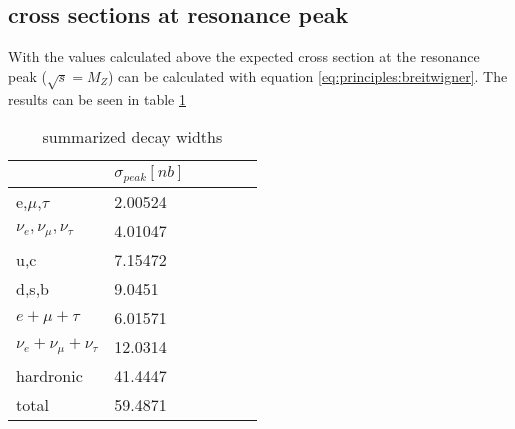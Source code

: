 \subsection{cross sections at resonance peak}
With the values calculated above the expected cross section at the resonance peak ($\sqrt{s}=M_Z$) can be calculated with equation \ref{eq:principles:breitwigner}.
The results can be seen in table \ref{tb:appendix:cross sections}
\begin{table}[H]\centering
	\begin{tabular}{@{}llllll@{}}
		\toprule
		& $\sigma_{peak}[nb]$\\
		\midrule
		e,$\mu $,$\tau $ & 2.00524 \\
		$\nu _e,\nu _{\mu },\nu _{\tau }$ & 4.01047 \\
		u,c & 7.15472 \\
		d,s,b & 9.0451 \\
		$e+\mu+\tau$ & 6.01571\\
		$\nu _e+\nu _{\mu }+\nu _{\tau }$ & 12.0314\\
		hardronic & 41.4447 \\
		total & 59.4871 \\
		\bottomrule
	\end{tabular}
	\caption{summarized decay widths}
	\label{tb:appendix:cross sections}
\end{table}
